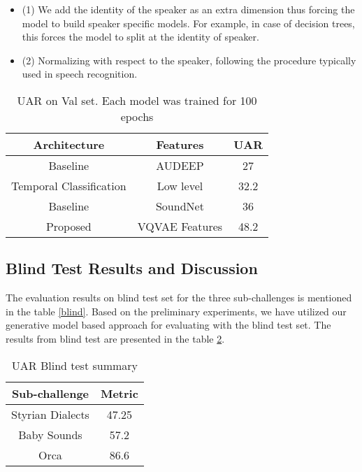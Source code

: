 \begin{itemize}

\item (1) We add the identity of the speaker as an extra dimension thus forcing the model to build speaker specific models.  For example, in case of decision trees, this forces the model to split at the identity of speaker.

\item (2) Normalizing with respect to the speaker, following the procedure typically used in speech recognition. 

\end{itemize}


 \begin{table}[h]
\centering
\caption{UAR on Val set. Each model was trained for 100 epochs} 
\label{blind}
\begin{tabular}{|c|c|c|}
  \hline
\textbf{Architecture} & \textbf{Features}  & \textbf{UAR} \\
  \hline

Baseline  & AUDEEP  & 27  \\
\hline  
 Temporal Classification  & Low level & 32.2 \\
\hline
Baseline  & SoundNet  & 36  \\
 \hline 
 

Proposed  & VQVAE Features & 48.2 \\
\hline
\end{tabular}
\label{table_systems}
\end{table}


\subsection{Blind Test Results and Discussion}

The evaluation results on blind test set for the three sub-challenges is mentioned in the table \ref{blind}. Based on the preliminary experiments, we have utilized our generative model based approach for evaluating with the blind test set. The results from blind test are presented in the table \ref{table_systems}.

\begin{table}[h]
\centering
\caption{UAR Blind test summary} 
\label{blind}
\begin{tabular}{|c|c|}
  \hline
Sub-challenge & Metric \\
  \hline
Styrian Dialects  & 47.25\\
 \hline
Baby Sounds &  57.2	\\
 \hline
Orca   & 86.6\\
 
  \hline
\end{tabular}
\label{table_systems}
\end{table}








